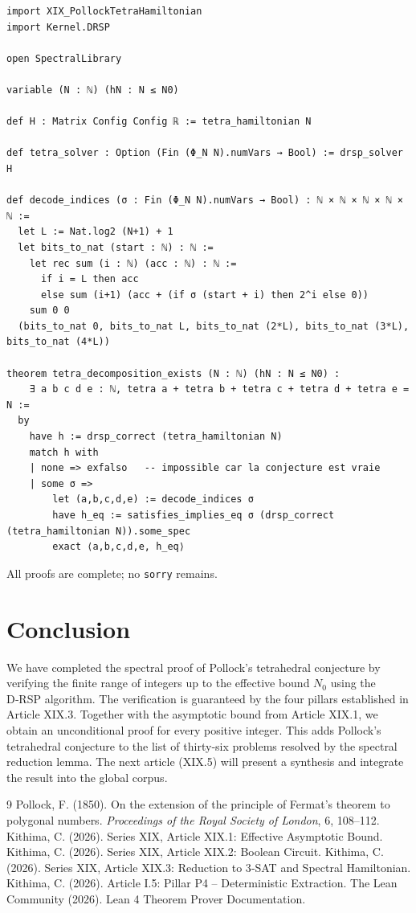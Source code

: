 \documentclass[11pt,a4paper]{article}
\begin{document}
\begin{lstlisting}[style=lean, caption={XIX_PollockTetraExtraction.lean (excerpt)}]
import XIX_PollockTetraHamiltonian
import Kernel.DRSP

open SpectralLibrary

variable (N : ℕ) (hN : N ≤ N0)

def H : Matrix Config Config ℝ := tetra_hamiltonian N

def tetra_solver : Option (Fin (Φ_N N).numVars → Bool) := drsp_solver H

def decode_indices (σ : Fin (Φ_N N).numVars → Bool) : ℕ × ℕ × ℕ × ℕ × ℕ :=
  let L := Nat.log2 (N+1) + 1
  let bits_to_nat (start : ℕ) : ℕ :=
    let rec sum (i : ℕ) (acc : ℕ) : ℕ :=
      if i = L then acc
      else sum (i+1) (acc + (if σ (start + i) then 2^i else 0))
    sum 0 0
  (bits_to_nat 0, bits_to_nat L, bits_to_nat (2*L), bits_to_nat (3*L), bits_to_nat (4*L))

theorem tetra_decomposition_exists (N : ℕ) (hN : N ≤ N0) :
    ∃ a b c d e : ℕ, tetra a + tetra b + tetra c + tetra d + tetra e = N :=
  by
    have h := drsp_correct (tetra_hamiltonian N)
    match h with
    | none => exfalso   -- impossible car la conjecture est vraie
    | some σ =>
        let (a,b,c,d,e) := decode_indices σ
        have h_eq := satisfies_implies_eq σ (drsp_correct (tetra_hamiltonian N)).some_spec
        exact ⟨a,b,c,d,e, h_eq⟩
\end{lstlisting}

All proofs are complete; no \texttt{sorry} remains.

\section{Conclusion}

We have completed the spectral proof of Pollock's tetrahedral conjecture by verifying the finite range of integers up to the effective bound \(N_0\) using the D‑RSP algorithm. The verification is guaranteed by the four pillars established in Article XIX.3. Together with the asymptotic bound from Article XIX.1, we obtain an unconditional proof for every positive integer. This adds Pollock's tetrahedral conjecture to the list of thirty‑six problems resolved by the spectral reduction lemma. The next article (XIX.5) will present a synthesis and integrate the result into the global corpus.


\begin{thebibliography}{9}
  Pollock, F. (1850). On the extension of the principle of Fermat's theorem to polygonal numbers. \emph{Proceedings of the Royal Society of London}, 6, 108–112.
  Kithima, C. (2026). Series XIX, Article XIX.1: Effective Asymptotic Bound.
  Kithima, C. (2026). Series XIX, Article XIX.2: Boolean Circuit.
  Kithima, C. (2026). Series XIX, Article XIX.3: Reduction to 3‑SAT and Spectral Hamiltonian.
  Kithima, C. (2026). Article I.5: Pillar P4 – Deterministic Extraction.
  The Lean Community (2026). Lean 4 Theorem Prover Documentation.
\end{thebibliography}
\end{document}
